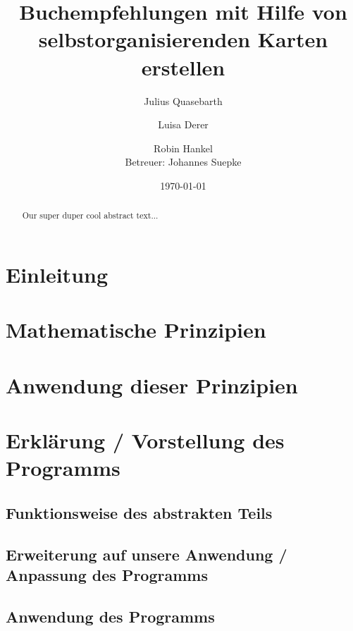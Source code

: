 \documentclass[a4paper]{article}
\title{Buchempfehlungen mit Hilfe von selbstorganisierenden Karten erstellen}
\author{Julius Quasebarth \and Luisa Derer \and Robin Hankel \\ Betreuer: Johannes Suepke}
\date{\today}
\begin{document}
\maketitle

\begin{otherlanguage}{english}
\begin{abstract}
Our super duper cool abstract text...
\end{abstract}
\end{otherlanguage}

\tableofcontents

\section{Einleitung}

\section{Mathematische Prinzipien}

\section{Anwendung dieser Prinzipien}

\section{Erklärung / Vorstellung des Programms}

\subsection{Funktionsweise des abstrakten Teils}

\subsection{Erweiterung auf unsere Anwendung / Anpassung des Programms}

\subsection{Anwendung des Programms}
\end{document}
